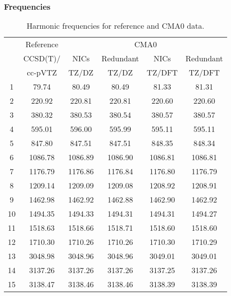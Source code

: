 \documentclass[10pt,oneside]{article}
\begin{document}
\begin{table}[h!]
\subsubsection*{Frequencies}
\centering
\caption{Harmonic frequencies for reference and CMA0 data.}
\begin{tabular}{cccccc}
\toprule
{} & Reference & \multicolumn{4}{c}{CMA0} \\
{} &  CCSD(T)/ &    NICs &  Redundant &    NICs & Redundant \\
{} &   cc-pVTZ &   TZ/DZ &      TZ/DZ &  TZ/DFT &    TZ/DFT \\
\midrule
1  &     79.74 &   80.49 &      80.49 &   81.33 &     81.31 \\
2  &    220.92 &  220.81 &     220.81 &  220.60 &    220.60 \\
3  &    380.32 &  380.53 &     380.54 &  380.57 &    380.57 \\
4  &    595.01 &  596.00 &     595.99 &  595.11 &    595.11 \\
5  &    847.80 &  847.51 &     847.51 &  848.35 &    848.34 \\
6  &   1086.78 & 1086.89 &    1086.90 & 1086.81 &   1086.81 \\
7  &   1176.79 & 1176.86 &    1176.84 & 1176.80 &   1176.79 \\
8  &   1209.14 & 1209.09 &    1209.08 & 1208.92 &   1208.91 \\
9  &   1462.98 & 1462.92 &    1462.88 & 1462.90 &   1462.92 \\
10 &   1494.35 & 1494.33 &    1494.31 & 1494.31 &   1494.27 \\
11 &   1518.63 & 1518.66 &    1518.71 & 1518.60 &   1518.60 \\
12 &   1710.30 & 1710.26 &    1710.26 & 1710.30 &   1710.29 \\
13 &   3048.98 & 3048.96 &    3048.96 & 3049.01 &   3049.01 \\
14 &   3137.26 & 3137.26 &    3137.26 & 3137.25 &   3137.26 \\
15 &   3138.47 & 3138.46 &    3138.46 & 3138.39 &   3138.39 \\
\bottomrule
\end{tabular}
\end{table}
\end{document}
